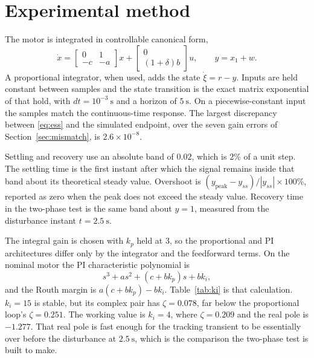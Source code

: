 \documentclass[12pt,a4paper]{article}
\begin{document}
\section{Experimental method}

The motor is integrated in controllable canonical form,
\[
  \dot x=\begin{bmatrix}0&1\\-c&-a\end{bmatrix}x
  +\begin{bmatrix}0\\(1+\delta)b\end{bmatrix}u,
  \qquad
  y=x_1+w.
\]
A proportional integrator, when used, adds the state \(\dot\xi=r-y\).
Inputs are held constant between samples and the state transition is the exact matrix exponential of that hold, with \(dt=10^{-3}~\mathrm{s}\) and a horizon of \(5~\mathrm{s}\).
On a piecewise-constant input the samples match the continuous-time response.
The largest discrepancy between \eqref{eq:ess} and the simulated endpoint, over the seven gain errors of Section~\ref{sec:mismatch}, is \(2.6\times 10^{-8}\).

Settling and recovery use an absolute band of \(0.02\), which is \(2\%\) of a unit step.
The settling time is the first instant after which the signal remains inside that band about its theoretical steady value.
Overshoot is \((y_{\mathrm{peak}}-y_{ss})/|y_{ss}|\times 100\%\), reported as zero when the peak does not exceed the steady value.
Recovery time in the two-phase test is the same band about \(y=1\), measured from the disturbance instant \(t=2.5~\mathrm{s}\).

The integral gain is chosen with \(k_p\) held at 3, so the proportional and PI architectures differ only by the integrator and the feedforward terms.
On the nominal motor the PI characteristic polynomial is
\begin{equation}
  s^3+as^2+(c+bk_p)s+bk_i,
  \label{eq:charPI}
\end{equation}
and the Routh margin is \(a(c+bk_p)-bk_i\).
Table~\ref{tab:ki} is that calculation.
\(k_i=15\) is stable, but its complex pair has \(\zeta=0.078\), far below the proportional loop's \(\zeta=0.251\).
The working value is \(k_i=4\), where \(\zeta=0.209\) and the real pole is \(-1.277\).
That real pole is fast enough for the tracking transient to be essentially over before the disturbance at \(2.5~\mathrm{s}\), which is the comparison the two-phase test is built to make.
\end{document}
